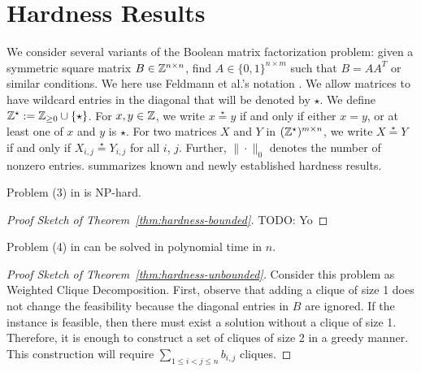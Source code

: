 \section{Hardness Results}

We consider several variants of the Boolean matrix factorization problem:
 given a symmetric square matrix $B \in \mathbb{Z}^{n \times n}$, find $A \in \{0,1\}^{n \times m}$ such that $B=AA^T$ or similar conditions.
We here use Feldmann et al.'s notation \cite{feldmann_fixed-parameter_2020}.
%
We allow matrices to have wildcard entries in the diagonal that will be denoted by $\star$.
We define $\mathbb{Z}^\star := \mathbb{Z}_{\geq 0} \cup \{\star\}$.
For $x, y \in \mathbb{Z}$, we write $x \stackrel{\star}{=} y$ if and only if either $x=y$, or at least one of $x$ and $y$ is $\star$.
For two matrices $X$ and $Y$ in $(\mathbb{Z}^\star)^{m\times n}$, we write $X \stackrel{\star}{=} Y$
 if and only if $X_{i,j} \stackrel{\star}{=} Y_{i,j}$ for all $i$, $j$.
Further, $\|\cdot\|_0$ denotes the number of nonzero entries.
%
 summarizes known and newly established hardness results.



\begin{thm}\label{thm:hardness-bounded}
  Problem (3) in  is NP-hard.
\end{thm}

\begin{proof}[Proof Sketch of Theorem~\ref{thm:hardness-bounded}]
  TODO: Yo
\end{proof}

\begin{thm}\label{thm:hardness-unbounded}
  Problem (4) in  can be solved in polynomial time in $n$.
\end{thm}

\begin{proof}[Proof Sketch of Theorem~\ref{thm:hardness-unbounded}]
  Consider this problem as Weighted Clique Decomposition.
  First, observe that adding a clique of size 1 does not change the feasibility
  because the diagonal entries in $B$ are ignored.
  If the instance is feasible, then there must exist a solution without a clique of size 1.
  Therefore, it is enough to construct a set of cliques of size 2 in a greedy manner.
  This construction will require $\sum_{1 \leq i < j \leq n}b_{i,j}$ cliques.
\end{proof}
